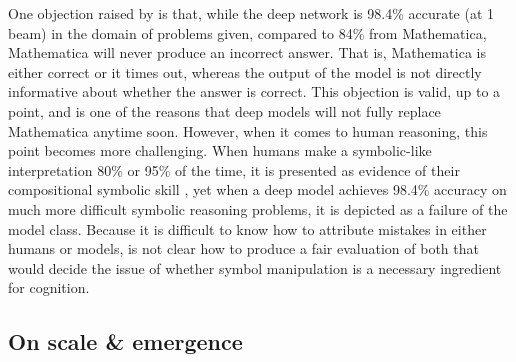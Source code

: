 One objection raised by \citet{Davis2019} is that, while the deep network is 98.4\% accurate (at 1 beam) in the domain of problems given, compared to 84\% from Mathematica, Mathematica will never produce an incorrect answer. That is, Mathematica is either correct or it times out, whereas the output of the model is not directly informative about whether the answer is correct. This objection is valid, up to a point, and is one of the reasons that deep models will not fully replace Mathematica anytime soon. However, when it comes to human reasoning, this point becomes more challenging. When humans make a symbolic-like interpretation 80\% or 95\% of the time, it is presented as evidence of their compositional symbolic skill \citep{Lake2019a}, yet when a deep model achieves 98.4\% accuracy on much more difficult symbolic reasoning problems, it is depicted as a failure of the model class. Because it is difficult to know how to attribute mistakes in either humans or models, is not clear how to produce a fair evaluation of both that would decide the issue of whether symbol manipulation is a necessary ingredient for cognition.\par 

\subsection{On scale \& emergence}

